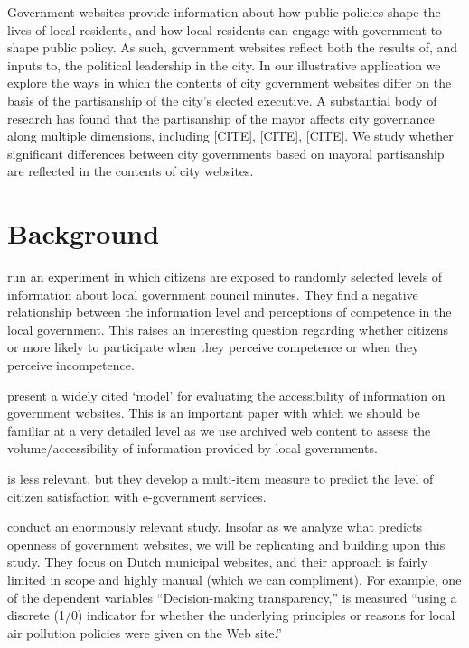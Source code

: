 \documentclass[11pt]{article}
\begin{document}
Government websites provide information about how public policies shape the lives of local residents, and how local residents can engage with government to shape public policy. As such, government websites reflect both the results of, and inputs to, the political leadership in the city. In our illustrative application we explore the ways in which the contents of city government websites differ on the basis of the partisanship of the city's elected executive. A substantial body of research has found that the partisanship of the mayor affects city governance along multiple dimensions, including [CITE], [CITE], [CITE]. We study whether significant differences between city governments based on mayoral partisanship are reflected in the contents of city websites.


\section{Background}

\cite{grimmelikhuijsen2010transparency} run an experiment in which citizens are exposed to randomly selected levels of information about local government council minutes. They find a negative relationship between the information level and perceptions of competence in the local government. This raises an interesting question regarding whether citizens or more likely to participate when they perceive competence or when they perceive incompetence.

\cite{wang2005evaluating} present a widely cited `model' for evaluating the accessibility of information on government websites. This is an important paper with which we should be familiar at a very detailed level as we use archived web content to assess the volume/accessibility of information provided by local governments.

\cite{osman2014cobra} is less relevant, but they develop a multi-item measure to predict the level of citizen satisfaction with e-government services. 


\cite{grimmelikhuijsen2012developing} conduct an enormously relevant study. Insofar as we analyze what predicts openness of government websites, we will be replicating and building upon this study. They focus on Dutch municipal websites, and their approach is fairly limited in scope and highly manual (which we can compliment). For example, one of the dependent variables ``Decision-making transparency,'' is measured ``using a discrete (1/0) indicator for whether the underlying principles or reasons for local air pollution policies were given on the Web site.'' 
\end{document}
